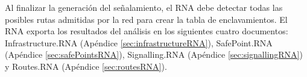 	Al finalizar la generación del señalamiento, el RNA debe detectar todas las posibles rutas admitidas por la red para crear la tabla de enclavamientos. El RNA exporta los resultados del análisis en los siguientes cuatro documentos: Infrastructure.RNA (Apéndice \ref{sec:infrastructureRNA}), SafePoint.RNA (Apéndice \ref{sec:safePointsRNA}), Signalling.RNA (Apéndice \ref{sec:signallingRNA}) y Routes.RNA (Apéndice \ref{sec:routesRNA}).	
